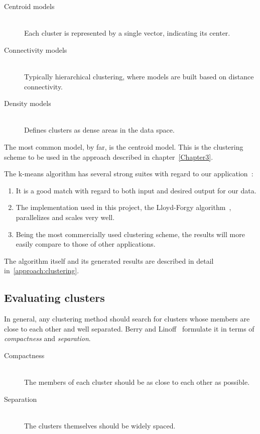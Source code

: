     \begin{description}
      \item[Centroid models] \hfill \\
        Each cluster is represented by a single vector, indicating its center.
      \item[Connectivity models] \hfill \\
        Typically hierarchical clustering, where models are built based on distance connectivity.
      \item[Density models] \hfill \\
        Defines clusters as dense areas in the data space.
    \end{description}

    The most common model, by far, is the centroid model. This is the clustering scheme to be used in the approach described in chapter~\ref{Chapter3}.

    The k-means algorithm has several strong suites with regard to our application~\cite{Berkhin2006}:

    \begin{enumerate}
      \item It is a good match with regard to both input and desired output for our data.
      \item The implementation used in this project, the Lloyd-Forgy algorithm~\cite{Forgy1965}, parallelizes and scales very well.
      \item Being the most commercially used clustering scheme, the results will more easily compare to those of other applications.
    \end{enumerate}

    The algorithm itself and its generated results are described in detail in~\ref{approach:clustering}.

  \subsection{Evaluating clusters}
  \label{survey:evaluating_clusters}

    In general, any clustering method should search for clusters whose members are close to each other and well separated. Berry and Linoff~\cite{Berry1996} formulate it in terms of \emph{compactness} and \emph{separation}.

    \begin{description}
      \item[Compactness] \hfill \\
        The members of each cluster should be as close to each other as possible.
      \item[Separation] \hfill \\
        The clusters themselves should be widely spaced.
    \end{description}

